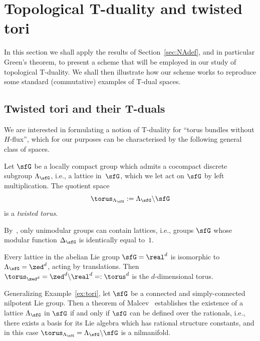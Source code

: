 \section{Topological T-duality and twisted tori}\label{sec:TopTtorus}

In this section we shall apply the results of Section~\ref{sec:NAdef}, and in particular
Green's theorem, to present a scheme
that will be employed in our study of topological T-duality. We shall
then illustrate how our scheme works to reproduce some standard
(commutative) examples of T-dual spaces.

\subsection{Twisted tori and their T-duals}\label{sec:twistedtori}

We are interested in formulating a notion of T-duality for
``torus bundles without $H$-flux'', which for our purposes can be
characterised by the following general class of spaces.

\begin{Definition}
Let $\sfG$ be a locally compact group which admits a
cocompact discrete subgroup $\Lambda_\sfG$, i.e., a lattice in~$\sfG$, which we let act on $\sfG$ by left
multiplication. The quotient space
\[
\torus_{\Lambda_\sfG}:=\Lambda_\sfG\backslash \sfG
\]
is a \emph{twisted torus}.
\end{Definition}

By~\cite[Lemma~6.2]{Milnor1976}, only unimodular groups can contain lattices, i.e., groups $\sfG$ whose
modular function $\Delta_\sfG$ is identically equal to~$1$.

\begin{Example}[tori]\label{ex:tori}
Every lattice in the abelian Lie group $\sfG=\real^d$ is
isomorphic to $\Lambda_\sfG=\zed^d$, acting by translations. Then
$\torus_{\zed^d}=\zed^d\backslash\real^d=:\torus^d$ is the $d$-dimensional torus.
\end{Example}

\begin{Example}[nilmanifolds]\label{ex:nilmanifolds}
Generalizing Example~\ref{ex:tori}, let $\sfG$ be a connected and simply-connected nilpotent Lie group. Then a theorem of
Malcev~\cite[Theorem~2.12]{Raghunathan1972} establishes the existence
of a lattice $\Lambda_\sfG$ in $\sfG$ if and only if
$\sfG$ can be defined over the rationals,
i.e., there exists a basis for its Lie algebra which has rational
structure constants, and in this case $\torus_{\Lambda_\sfG}=\Lambda_\sfG\backslash \sfG$ is a nilmanifold.
\end{Example}

